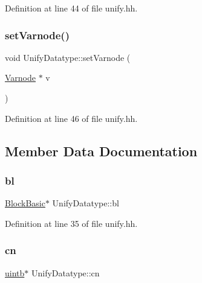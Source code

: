 Definition at line 44 of file unify.\+hh.

\mbox{\label{class_unify_datatype_ad1117ec3dacabf1261b6d4a86f13df88}} 
\subsubsection{\texorpdfstring{setVarnode()}{setVarnode()}}
{\footnotesize\ttfamily void Unify\+Datatype\+::set\+Varnode (\begin{DoxyParamCaption}\item[{\mbox{\hyperlink{class_varnode}{Varnode}} $\ast$}]{v }\end{DoxyParamCaption})\hspace{0.3cm}{\ttfamily [inline]}}



Definition at line 46 of file unify.\+hh.



\subsection{Member Data Documentation}
\mbox{\label{class_unify_datatype_ace819244637995ea7ca60527485f84c0}} 
\subsubsection{\texorpdfstring{bl}{bl}}
{\footnotesize\ttfamily \mbox{\hyperlink{class_block_basic}{Block\+Basic}}$\ast$ Unify\+Datatype\+::bl}



Definition at line 35 of file unify.\+hh.

\mbox{\label{class_unify_datatype_ad04674355f13216441bd4db05c9fe16a}} 
\subsubsection{\texorpdfstring{cn}{cn}}
{\footnotesize\ttfamily \mbox{\hyperlink{types_8h_a2db313c5d32a12b01d26ac9b3bca178f}{uintb}}$\ast$ Unify\+Datatype\+::cn}



